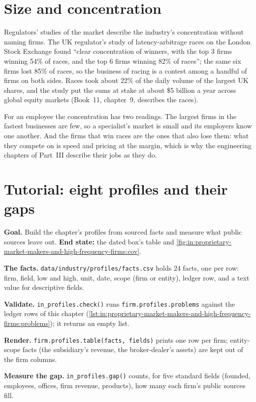 \section{Size and concentration}

Regulators' studies of the market describe the industry's concentration without naming firms. The UK regulator's study
of latency-arbitrage races on the London Stock Exchange found ``clear concentration of winners, with the top 3 firms
winning 54\% of races, and the top 6 firms winning 82\% of races''; the same six firms lost 85\% of races, so the
business of racing is a contest among a handful of firms on both sides. Races took about 22\% of the daily volume of
the largest UK shares, and the study put the sums at stake at about \$5 billion a year across global equity markets
(Book~11, chapter~9, describes the races).

For an employee the concentration has two readings. The largest firms in the fastest businesses are few, so a
specialist's market is small and its employers know one another. And the firms that win races are the ones that also
lose them: what they compete on is speed and pricing at the margin, which is why the engineering chapters of Part~III
describe their jobs as they do.

\section{Tutorial: eight profiles and their gaps}\label{tut:in:proprietary-market-makers-and-high-frequency-firms:tut}

\begin{tutorial}
\textbf{Goal.} Build the chapter's profiles from sourced facts and measure what public sources leave out.
\textbf{End state:} the dated box's table and \cref{fig:in:proprietary-market-makers-and-high-frequency-firms:cov}.
\begin{tutsteps}
\item \textbf{The facts.} \texttt{data/industry/profiles/facts.csv} holds 24 facts, one per row: firm, field, low and
high, unit, date, scope (firm or entity), ledger row, and a text value for descriptive fields.
\item \textbf{Validate.} \texttt{in\_profiles.check()} runs \texttt{firm.profiles.problems} against the ledger rows of
this chapter (\cref{lst:in:proprietary-market-makers-and-high-frequency-firms:problems}); it returns an empty list.
\label{lst:in:proprietary-market-makers-and-high-frequency-firms:problems}
\item \textbf{Render.} \texttt{firm.profiles.table(facts, fields)} prints one row per firm; entity-scope facts (the
subsidiary's revenue, the broker-dealer's assets) are kept out of the firm columns.
\item \textbf{Measure the gap.} \texttt{in\_profiles.gap()} counts, for five standard fields (founded, employees,
offices, firm revenue, products), how many each firm's public sources fill.
\end{tutsteps}
\end{tutorial}

